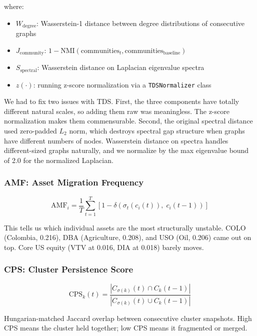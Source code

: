 \documentclass[12pt, letterpaper]{article}
\begin{document}
where:
\begin{itemize}
    \item $W_{\text{degree}}$: Wasserstein-1 distance between degree distributions of consecutive graphs
    \item $J_{\text{community}}$: $1 - \text{NMI}(\text{communities}_t, \text{communities}_{\text{baseline}})$
    \item $S_{\text{spectral}}$: Wasserstein distance on Laplacian eigenvalue spectra
    \item $z(\cdot)$: running z-score normalization via a \texttt{TDSNormalizer} class
\end{itemize}

We had to fix two issues with TDS. First, the three components have totally different natural scales, so adding them raw was meaningless. The z-score normalization makes them commensurable. Second, the original spectral distance used zero-padded $L_2$ norm, which destroys spectral gap structure when graphs have different numbers of nodes. Wasserstein distance on spectra handles different-sized graphs naturally, and we normalize by the max eigenvalue bound of 2.0 for the normalized Laplacian.

\subsubsection{AMF: Asset Migration Frequency}

\begin{equation}
    \text{AMF}_i = \frac{1}{T} \sum_{t=1}^{T} \left[ 1 - \delta\!\left(\sigma_t\!\left(c_i(t)\right),\; c_i(t-1)\right) \right]
\end{equation}

This tells us which individual assets are the most structurally unstable. COLO (Colombia, 0.216), DBA (Agriculture, 0.208), and USO (Oil, 0.206) came out on top. Core US equity (VTV at 0.016, DIA at 0.018) barely moves.

\subsubsection{CPS: Cluster Persistence Score}

\begin{equation}
    \text{CPS}_k(t) = \frac{|C_{\sigma(k)}(t) \cap C_k(t-1)|}{|C_{\sigma(k)}(t) \cup C_k(t-1)|}
\end{equation}

Hungarian-matched Jaccard overlap between consecutive cluster snapshots. High CPS means the cluster held together; low CPS means it fragmented or merged.
\end{document}
